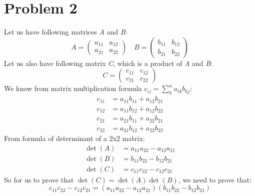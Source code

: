 \documentclass[12pt]{article}
\begin{document}
\renewcommand{\familydefault}{\rmdefault}




\section{Problem 2}
Let us have following matrices \textit{A} and \textit{B}:
\begin{equation}
    A = \begin{pmatrix}
        a_{11} & a_{12} \\
        a_{21} & a_{22}
    \end{pmatrix}
    \quad
    B = \begin{pmatrix}
        b_{11} & b_{12} \\
        b_{21} & b_{22}
    \end{pmatrix}
\end{equation}
Let us also have following matrix \textit{C}, which is a product of \textit{A} and \textit{B}:
\begin{equation}
    C = \begin{pmatrix}
        c_{11} & c_{12} \\
        c_{21} & c_{22}
    \end{pmatrix}
\end{equation}
We know from matrix multiplication formula $c_{ij} = \sum_k^na_{ik}b_{kj}$:
\begin{equation}
    \label{eq:cmatrix}
    \begin{split}
        c_{11} &= a_{11}b_{11} + a_{12}b_{21} \\
        c_{12} &= a_{11}b_{12} + a_{12}b_{22} \\
        c_{21} &= a_{21}b_{11} + a_{22}b_{21} \\
        c_{22} &= a_{21}b_{12} + a_{22}b_{22}
    \end{split}
\end{equation}
From formula of determinant of a 2x2 matrix:
\begin{equation}
    \begin{split}
        \det(A) &= a_{11}a_{22} - a_{12}a_{21} \\
        \det(B) &= b_{11}b_{22} - b_{12}b_{21} \\
        \det(C) &= c_{11}c_{22} - c_{12}c_{21}
    \end{split}
\end{equation}
So for us to prove that $\det(C) = \det(A)\det(B)$, we need to prove that:
\begin{equation}
        c_{11}c_{22} - c_{12}c_{21} = (a_{11}a_{22} - a_{12}a_{21})(b_{11}b_{22} - b_{12}b_{21})
\end{equation}
\end{document}
